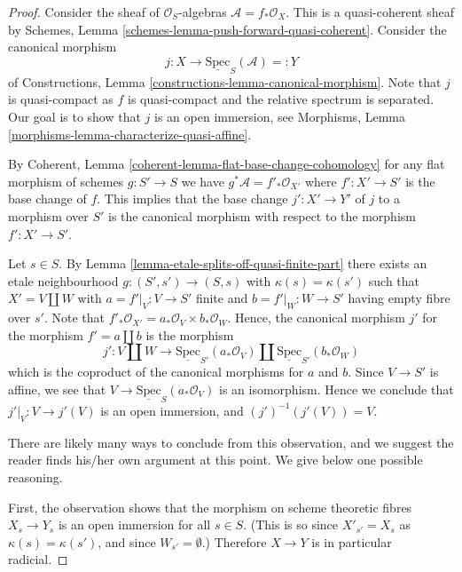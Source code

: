 \begin{proof}
Consider the sheaf of $\mathcal{O}_S$-algebras
$\mathcal{A} = f_*\mathcal{O}_X$. This is a quasi-coherent
sheaf by Schemes, Lemma \ref{schemes-lemma-push-forward-quasi-coherent}.
Consider the canonical morphism
$$
j : X \longrightarrow \underline{\text{Spec}}_S(\mathcal{A}) =: Y
$$
of Constructions, Lemma \ref{constructions-lemma-canonical-morphism}.
Note that $j$ is quasi-compact as $f$ is quasi-compact
and the relative spectrum is separated.
Our goal is to show that $j$ is an open immersion, see
Morphisms, Lemma \ref{morphisms-lemma-characterize-quasi-affine}.

\medskip\noindent
By Coherent, Lemma \ref{coherent-lemma-flat-base-change-cohomology}
for any flat morphism of schemes
$g : S' \to S$ we have $g^*\mathcal{A} = f'_*\mathcal{O}_{X'}$
where $f' : X' \to S'$ is the base change of $f$. This implies
that the base change $j' : X' \to Y'$ of $j$ to a morphism over $S'$ is
the canonical morphism with respect to the morphism $f' : X' \to S'$.

\medskip\noindent
Let $s \in S$. By Lemma \ref{lemma-etale-splits-off-quasi-finite-part}
there exists an etale neighbourhood $g : (S', s') \to (S, s)$
with $\kappa(s) = \kappa(s')$
such that $X' = V \coprod W$ with $a = f'|_V: V \to S'$ finite and
$b = f'|_W : W \to S'$ having empty fibre over $s'$.
Note that $f'_*\mathcal{O}_{X'} = a_*\mathcal{O}_V \times b_*\mathcal{O}_W$.
Hence, the canonical morphism $j'$ for the morphism $f' = a \coprod b$
is the morphism
$$
j' :
V \coprod W
\longrightarrow
\underline{\text{Spec}}_{S'}(a_*\mathcal{O}_V)
\coprod
\underline{\text{Spec}}_{S'}(b_*\mathcal{O}_W)
$$
which is the coproduct of the canonical morphisms for
$a$ and $b$. Since $V \to S'$ is affine, we see that
$V \to \underline{\text{Spec}}_S(a_*\mathcal{O}_V)$
is an isomorphism. Hence we conclude that
$j'|_V : V \to j'(V)$
is an open immersion, and $(j')^{-1}(j'(V)) = V$.

\medskip\noindent
There are likely many ways to conclude from this observation, and we suggest
the reader finds his/her own argument at this point. We give below one
possible reasoning.

\medskip\noindent
First, the observation shows that the
morphism on scheme theoretic fibres $X_s \to Y_s$ is an open immersion
for all $s \in S$. (This is so since $X'_{s'} = X_s$ as
$\kappa(s) = \kappa(s')$, and since $W_{s'} = \emptyset$.)
Therefore $X \to Y$ is in particular radicial.


\end{proof}
